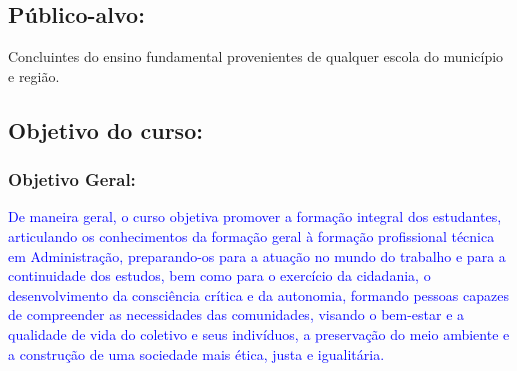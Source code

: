 \documentclass{../../modelos/latex-shared/ifsc-ppc}
\newcommand{\revisao}[1]{\textcolor{blue}{#1}}
\newcommand{\revisao}[1]{#1}
\newcommand{\semsumario}[1]{\addtocontents{toc}{\protect\setcounter{tocdepth}{2}}#1\addtocontents{toc}{\protect\setcounter{tocdepth}{4}}}
\begin{document}
\subsection{Público-alvo:}
Concluintes do ensino fundamental provenientes de qualquer escola do município e região.

\subsection{Objetivo do curso:}
\semsumario{\subsubsection{Objetivo Geral:}}
\revisao{De maneira geral, o curso objetiva promover a formação integral dos estudantes, articulando os conhecimentos da formação geral à formação profissional técnica em Administração, preparando-os para a atuação no mundo do trabalho e para a continuidade dos estudos, bem como para o exercício da cidadania, o desenvolvimento da consciência crítica e da autonomia, formando pessoas capazes de compreender as necessidades das comunidades, visando o bem-estar e a qualidade de vida do coletivo e seus indivíduos, a preservação do meio ambiente e a construção de uma sociedade mais ética, justa e igualitária.}
\end{document}
